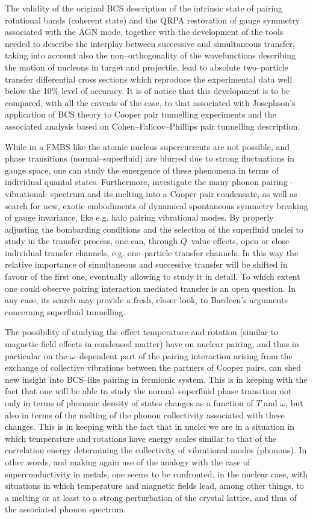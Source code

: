 \documentclass[a4paper,14pt]{book}
\begin{document}
The validity of the original BCS description of the intrinsic state of pairing rotational bands (coherent state) and the QRPA restoration of gauge symmetry associated with the AGN mode, together with the development of the tools needed to describe the interplay between successive and simultaneous transfer, taking into account also the non--orthogonality of the wavefunctions describing the motion of nucleons in target and projectile, lead to absolute two--particle transfer differential cross sections which reproduce the experimental data well below the 10\% level of accuracy. It is of notice that this development is to be compared,  with all the caveats of the case, to that associated with Josephson's application of BCS theory to Cooper pair tunnelling experiments and the associated analysis based on Cohen--Falicov--Phillips pair tunnelling description. 


While in a FMBS like the atomic nucleus supercurrents are not possible, and phase transitions (normal--superfluid) are blurred due to strong fluctuations in gauge space, one can study the emergence of these phenomena in terms of individual quantal states. Furthermore, investigate the many phonon pairing -vibrational-  spectrum and its melting into a Cooper pair condensate, as well as search for new, exotic embodiments of dynamical spontaneous symmetry breaking of gauge invariance, like e.g. halo pairing vibrational modes. By properly adjusting the bombarding conditions and the selection of the superfluid nuclei to study in the transfer process, one can, through $Q$--value effects, open or close individual transfer channels, e.g. one--particle transfer channels. In this way the relative importance of simultaneous and successive transfer will be shifted in favour of the first one, eventually allowing to study it in detail. To which extent one could observe pairing interaction mediated transfer is an open question. In any case, its search may provide a fresh, closer look, to Bardeen's arguments concerning superfluid tunnelling. 



The possibility of studying the effect temperature and  rotation (similar to magnetic field effects in condensed matter) have on nuclear pairing, and thus in particular on the $\omega$--dependent part of the pairing interaction arising from the exchange of collective vibrations between the partners of Cooper pairs, can shed new insight into BCS--like pairing in fermionic system. This is in keeping with the fact that one will be able to study the normal--superfluid phase transition not only in terms of phononic density of states changes as a function of $T$ and $\omega$, but also in terms of the melting of the phonon collectivity associated with these changes. This is in keeping with the fact that in nuclei we are in a situation in which temperature and rotations have energy scales similar to that of the correlation energy determining the collectivity of vibrational modes (phonons). In other words, and making again use of the analogy with the case of superconductivity in metals, one seems to be  confronted, in the nuclear case, with situations in which temperature and magnetic fields lead, among other things, to a melting or at least to a strong perturbation of the crystal lattice, and thus of the associated phonon spectrum.
\end{document}
